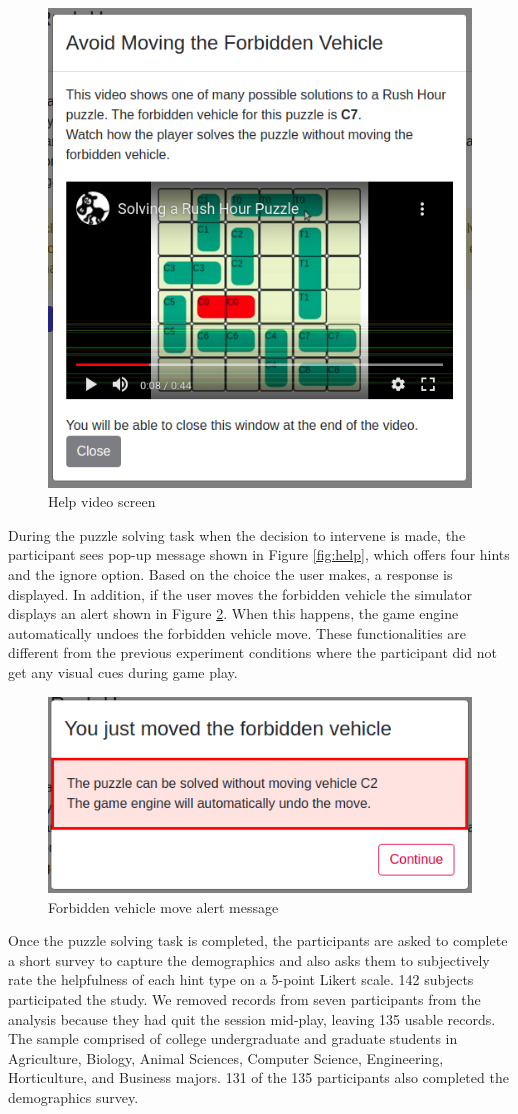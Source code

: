 \documentclass[doctor]{thesis} %
\theoremstyle{plain}
\begin{document}
\begin{figure}[!htb]
  \centering
  \includegraphics[width=0.6\columnwidth, keepaspectratio=true]{img/help.png}
  \caption{Help video screen}
  \label{fig:video}
\end{figure}

During the puzzle solving task when the decision to intervene is made, the participant sees pop-up message shown in Figure \ref{fig:help}, which offers four hints and the ignore option. Based on the choice the user makes, a response is displayed. In addition, if the user moves the forbidden vehicle the simulator displays an alert shown in Figure \ref{fig:badcar}. When this happens, the game engine automatically undoes the forbidden vehicle move. These functionalities are different from the previous experiment conditions where the participant did not get any visual cues during game play.
\begin{figure}[!htb]
  \centering
  \includegraphics[width=0.5\columnwidth, keepaspectratio=true]{img/badcaralert.png}
  \caption{Forbidden vehicle move alert message}
  \label{fig:badcar}
\end{figure}
Once the puzzle solving task is completed, the participants are asked to complete a short survey to capture the demographics and also asks them to subjectively rate the helpfulness of each hint type on a 5-point Likert scale. 142 subjects participated the study. We removed records from seven participants from the analysis because they had quit the session mid-play, leaving 135 usable records. The sample comprised of college undergraduate and graduate students in Agriculture, Biology, Animal Sciences, Computer Science, Engineering, Horticulture, and Business majors. 131 of the 135 participants also completed the demographics survey.
\end{document}
